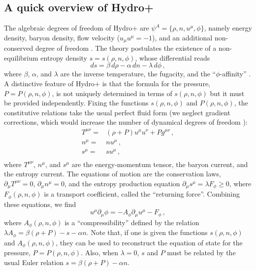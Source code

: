 \documentclass[a4paper, amsfonts, amssymb, amsmath, reprint, showkeys, nofootinbib, twoside, onecolumn,notitlepage]{revtex4-1}
\begin{document}
\subsection{A quick overview of Hydro+}

The algebraic degrees of freedom of Hydro+ are $\psi^A=\{\rho,n,u^\mu,\phi \}$, namely energy density, baryon density, flow velocity ($u_\mu u^\mu=-1$), and an additional non-conserved degree of freedom \cite{Hydro+2018}. The theory postulates the existence of a non-equilibrium entropy density $s=s(\rho,n,\phi)$, whose differential reads
\begin{equation}\label{dsHydroplus}
ds=\beta \, d\rho -\alpha \, dn - \lambda \, d\phi \, ,
\end{equation}
where $\beta$, $\alpha$, and $\lambda$ are the inverse temperature, the fugacity, and the ``$\phi$-affinity'' \cite{PrigoginebookModernThermodynamics2014}. A distinctive feature of Hydro+ is that the formula for the pressure, $P=P(\rho,n,\phi)$, is not uniquely determined in terms of $s(\rho,n,\phi)$ but it must be provided independently. Fixing the functions $s(\rho,n,\phi)$ and $P(\rho,n,\phi)$, the constitutive relations take the usual perfect fluid form (we neglect gradient corrections, which would increase the number of dynamical degrees of freedom \cite{GavassinoLyapunov_2020}): 
\begin{equation}
\begin{split}
T^{\mu \nu}={}& (\rho+P)u^\mu u^\nu+Pg^{\mu \nu} \, ,\\
n^\mu ={}& nu^\mu \, ,\\
s^\mu ={}& su^\mu \, ,\\
\end{split}
\end{equation}
where $T^{\mu \nu}$, $n^\mu$, and $s^\mu$ are the energy-momentum tensor, the baryon current, and the entropy current. The equations of motion are the conservation laws, $\partial_\mu T^{\mu \nu}=0$, $\partial_\mu n^\mu=0$, and the entropy production equation $\partial_\mu s^\mu=\lambda F_\phi \geq 0$, where $F_\phi(\rho,n,\phi)$ is a transport coefficient, called the ``returning force''. Combining these equations, we find
\begin{equation}\label{hydrolpusfieldmode}
u^\mu \partial_\mu \phi =-A_\phi \partial_\mu u^\mu -F_\phi \, ,
\end{equation}
where $A_\phi(\rho,n,\phi)$ is a ``compressibility'' defined by the relation $\lambda A_\phi =\beta (\rho+P)-s-\alpha n$. Note that, if one is given the functions $s(\rho,n,\phi)$ and $A_\phi(\rho,n,\phi)$, they can be used to reconstruct the equation of state for the pressure, $P=P(\rho,n,\phi)$. Also, when $\lambda=0$, $s$ and $P$ must be related by the usual Euler relation $s=\beta(\rho+P)-\alpha n$.
\end{document}
